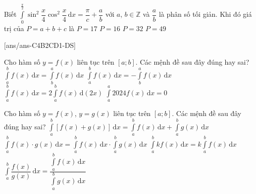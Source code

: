 \begin{ex}%
	Biết $\displaystyle\int\limits_0^{\tfrac{\pi}{2}}\sin^2\dfrac{x}{4}{\cos^2}\dfrac{x}{4}\mathrm{\,d}x=\dfrac{\pi}{c}+\dfrac{a}{b}$ với $a$, $b\in\mathbb{Z}$ và $\dfrac{a}{b}$ là phân số tối giản. Khi đó giá trị của $ P=a+b+c$ là
	\choice
	{$ P=17$}
	{$ P=16$}
	{$ P=32$}
	{\True $ P=49$}
\end{ex}
\TNTF
{}[ans/ans-C4B2CD1-DS]
\begin{ex}%
	Cho hàm số $y=f(x)$ liên tục trên $\left[a;b\right]$. Các mệnh đề sau đây đúng hay sai?
	\choiceTF
	{$\int\limits_a^b{f(x)\mathrm{\,d}x}=\int\limits_b^a{f(x)\mathrm{\,d}x}$}
	{\True $\int\limits_a^b{f(x)\mathrm{\,d}x}=-\int\limits_b^a{f(x)\mathrm{\,d}x}$}
	{$\int\limits_a^bf(x)\mathrm{\,d}x=2\int\limits_a^bf(x)\mathrm{\,d}\left(2x\right)$}
	{\True $\int\limits_a^a{2024f(x)\mathrm{\,d}x=0}$}
\end{ex}
%
\begin{ex}%
	Cho hàm số $y=f(x)$, $y=g(x)$ liên tục trên $\left[a;b\right]$. Các mệnh đề sau đây đúng hay sai?
	\choiceTF
	{\True $\int\limits_a^b{\left[f(x)+g(x)\right]\mathrm{\,d}x}=\int\limits_a^b{f(x)}\mathrm{\,d}x+\int\limits_a^b{g(x)\mathrm{\,d}x}$}
	{$\int\limits_a^b{f(x)\cdot g(x)\mathrm{\,d}x}=\int\limits_a^b{f(x)\mathrm{\,d}x}\cdot\int\limits_a^b{g(x)\mathrm{\,d}x}$}
	{\True $\int\limits_a^b{kf(x)\mathrm{\,d}x=k\int\limits_a^b{f(x)\mathrm{\,d}x}}$}
	{$\int\limits_a^b{\dfrac{f(x)}{g(x)}\mathrm{\,d}x}=\dfrac{\int\limits_a^bf(x)\mathrm{\,d}x}{\int\limits_a^bg(x)\mathrm{\,d}x}$}
\end{ex}
